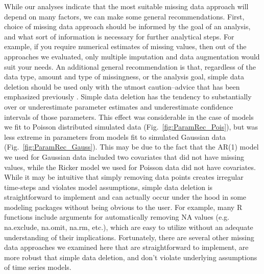 \documentclass{article}
\begin{document}
While our analyses indicate that the most suitable missing data approach will depend on many factors, we can make some general recommendations. First, choice of missing data approach should be informed by the goal of an analysis, and what sort of information is necessary for further analytical steps. For example, if you require numerical estimates of missing values, then out of the approaches we evaluated, only multiple imputation and data augmentation would suit your needs. An additional general recommendation is that, regardless of the data type, amount and type of missingness, or the analysis goal, simple data deletion should be used only with the utmost caution--advice that has been emphasized previously \citep[e.g.,][]{nakagawa_model_2011, Shoari2018_mnar,lopucki2022handling}. Simple data deletion has the tendency to substantially over or underestimate parameter estimates and underestimate confidence intervals of those parameters. This effect was considerable in the case of models we fit to Poisson distributed simulated data (Fig.\ \ref{fig:ParamRec_Pois}), but was less extreme in parameters from models fit to simulated Gaussian data (Fig.\ \ref{fig:ParamRec_Gauss}). This may be due to the fact that the AR(1) model we used for Gaussian data included two covariates that did not have missing values, while the Ricker model we used for Poisson data did not have covariates. %
While it may be intuitive that simply removing data points creates irregular time-steps and violates model assumptions, simple data deletion is straightforward to implement and can actually occur under the hood in some modeling packages without being obvious to the user. For example, many R functions include arguments for automatically removing NA values (e.g. na.exclude, na.omit, na.rm, etc.), which are easy to utilize without an adequate understanding of their implications. Fortunately, there are several other missing data approaches we examined here that are straightforward to implement, are more robust that simple data deletion, and don't violate underlying assumptions of time series models.
\end{document}
